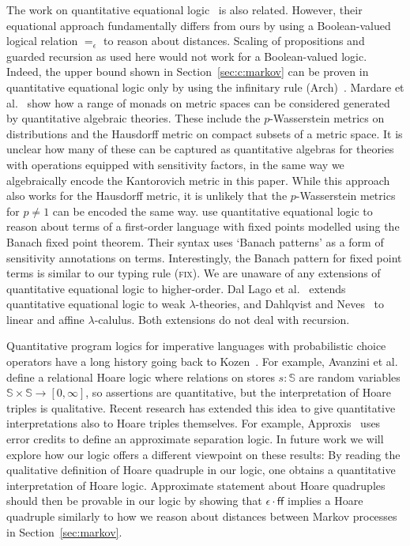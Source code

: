 \documentclass[a4paper,UKenglish,cleveref, autoref, thm-restate]{lipics-v2021}
\newcommand{\extpreals}{[0,\infty]}
\newcommand{\false}{\mathsf{ff}}
\newcommand{\peq}{=}
\newcommand{\store}{\mathbb{S}}
\begin{document}
The work on quantitative equational logic~\cite{MardarePP16,MardarePP18,MardarePP21} is also related. 
However, their equational approach fundamentally differs from ours
by using a Boolean-valued logical relation $\peq_\epsilon$ to reason about distances. Scaling of propositions and 
guarded recursion as used here would not work for 
a Boolean-valued logic. Indeed, the upper bound shown
in Section~\ref{sec:c:markov} can be proven in quantitative equational logic only by using the infinitary rule (Arch)~\cite{BacciBLM18}.
Mardare et al.~\cite{MardarePP16} show how a range of monads on metric spaces can be considered 
generated by quantitative algebraic theories. These include %
the $p$-Wasserstein metrics on distributions and the Hausdorff metric on compact subsets of a metric space. It is unclear how many of these can be captured as quantitative algebras for theories with operations equipped with sensitivity factors, in the same way we algebraically encode the Kantorovich metric in this paper. While this approach also works for the Hausdorff metric, it is unlikely that the $p$-Wasserstein metrics for $p\neq 1$ can be encoded the same way. 
\cite{MardarePP21} use quantitative equational logic to reason about terms of a first-order language with fixed points modelled using the Banach fixed point theorem. Their syntax uses `Banach patterns' as a form of sensitivity annotations on terms. Interestingly, the Banach pattern for fixed point terms is similar to our typing rule (\textsc{fix}).
We are unaware of any extensions of quantitative equational logic to higher-order. 
Dal Lago et al.~\cite{LagoHLP22} extends quantitative equational logic to weak $\lambda$-theories, and Dahlqvist and Neves~\cite{DahlqvistN22,DahlqvistN23} to linear and affine $\lambda$-calulus. Both extensions do not deal with recursion.%

Quantitative program logics for imperative languages with probabilistic choice operators have a long history going back
to Kozen~\cite{Kozen85}. For example, Avanzini et al.~\cite{AvanziniBDG25} define a relational Hoare logic where relations on stores $s : \store$ 
are random variables $\store \times \store \to \extpreals$, so assertions are quantitative, but the interpretation of Hoare triples
is qualitative. Recent research has extended this idea to give quantitative interpretations also to Hoare triples themselves. 
For example, Approxis~\cite{GregersenAHTB24} uses error credits to define an approximate separation logic. 
In future work we will explore how our logic offers a different viewpoint on these results: 
By reading the qualitative definition of Hoare quadruple in our 
logic, one obtains a quantitative interpretation of Hoare logic. Approximate statement about Hoare quadruples 
should then be provable in our logic by showing that $\epsilon\cdot \false$ implies a Hoare quadruple similarly to how 
we reason about distances between Markov processes in Section~\ref{sec:markov}. 
\end{document}
